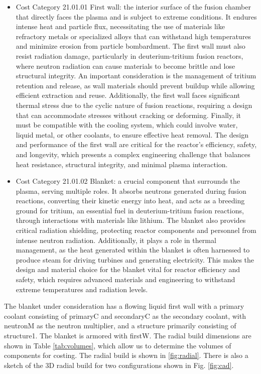 \begin{itemize}
    \item Cost Category 21.01.01 First wall: the interior surface of the fusion chamber that directly faces the plasma and is subject to extreme conditions. It endures intense heat and particle flux, necessitating the use of materials like refractory metals or specialized alloys that can withstand high temperatures and minimize erosion from particle bombardment. The first wall must also resist radiation damage, particularly in deuterium-tritium fusion reactors, where neutron radiation can cause materials to become brittle and lose structural integrity. An important consideration is the management of tritium retention and release, as wall materials should prevent buildup while allowing efficient extraction and reuse. Additionally, the first wall faces significant thermal stress due to the cyclic nature of fusion reactions, requiring a design that can accommodate stresses without cracking or deforming. Finally, it must be compatible with the cooling system, which could involve water, liquid metal, or other coolants, to ensure effective heat removal. The design and performance of the first wall are critical for the reactor's efficiency, safety, and longevity, which presents a complex engineering challenge that balances heat resistance, structural integrity, and minimal plasma interaction.
    \item Cost Category 21.01.02 Blanket: a crucial component that surrounds the plasma, serving multiple roles. It absorbs neutrons generated during fusion reactions, converting their kinetic energy into heat, and acts as a breeding ground for tritium, an essential fuel in deuterium-tritium fusion reactions, through interactions with materials like lithium. The blanket also provides critical radiation shielding, protecting reactor components and personnel from intense neutron radiation. Additionally, it plays a role in thermal management, as the heat generated within the blanket is often harnessed to produce steam for driving turbines and generating electricity. This makes the design and material choice for the blanket vital for reactor efficiency and safety, which requires advanced materials and engineering to withstand extreme temperatures and radiation levels.
\end{itemize}

The blanket under consideration has a flowing liquid first wall with a primary coolant consisting of primaryC and secondaryC as the secondary coolant, with neutronM as the neutron multiplier, and a structure primarily consisting of structure1.  The blanket is armored with firstW.  The radial build dimensions are shown in Table \ref{tab:volumes}, which allow us to determine the volumes of components for costing.  The radial build is shown in \ref{fig:radial}.   There is also a sketch of the 3D radial build for two configurations shown in Fig. \ref{fig:cad}.


